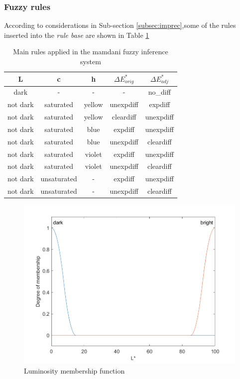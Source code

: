 \documentclass[twocolumn,a4paper]{article}
\begin{document}
\subsubsection{Fuzzy rules} According to considerations in Sub-section \ref{subsec:imprec},some of the rules inserted into the \textit{rule base} are shown in Table \ref{tab:rules}
\begin{table}[]
\centering
{}
\begin{tabular}{|c c c c c |}
\hline
\rowcolor{gray!50}
L & c  & h & $\Delta E^*_{orig}$ & $\Delta E^*_{adj}$ \\ \hline
dark       & -           & -          & -                 & no\_diff              \\ \hline
not dark   & saturated   & yellow     & unexpdiff         & expdiff               \\ \hline
not dark   & saturated   & yellow     & cleardiff         & unexpdiff             \\ \hline
not dark   & saturated   & blue       & expdiff           & unexpdiff             \\ \hline
not dark   & saturated   & blue       & unexpdiff         & cleardiff             \\ \hline
not dark   & saturated   & violet     & expdiff           & unexpdiff             \\ \hline
not dark   & saturated   & violet     & unexpdiff         & cleardiff             \\ \hline
not dark   & unsaturated & -          & expdiff           & unexpdiff             \\ \hline
not dark   & unsaturated & -          & unexpdiff         & cleardiff             \\ \hline
\end{tabular}
\caption{Main rules applied in the mamdani fuzzy inference system}
\label{tab:rules}
\end{table}
\begin{figure}
	\centering
	\includegraphics[scale=0.5]{images/mf_L.png}
	\caption{Luminosity membership function}
	\label{fig:mfl}
\end{figure}
\end{document}
